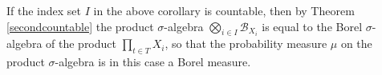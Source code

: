 \documentclass{article}
\theoremstyle{definition}
\begin{document}
If the index set $I$ in the above corollary is countable, then by Theorem \ref{secondcountable} the product $\sigma$-algebra $\bigotimes_{i \in I}
\mathscr{B}_{X_i}$ is equal
to the Borel $\sigma$-algebra of the product $\prod_{t \in T} X_i$, so that the probability measure $\mu$ on the product $\sigma$-algebra
is in this case a Borel measure.
\end{document}
